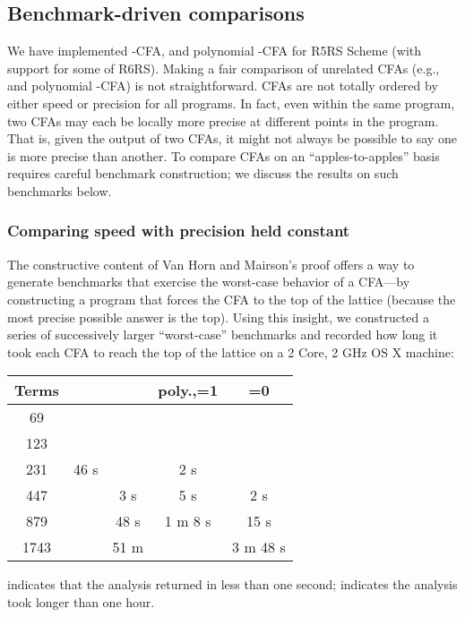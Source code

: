 \subsection{Benchmark-driven comparisons}

We have implemented -CFA, \nCFA{} and polynomial -CFA for R5RS
Scheme (with support for some of R6RS).
Making a fair comparison of unrelated CFAs (e.g., \nCFA{} and
polynomial -CFA) is not straightforward.
CFAs are not totally ordered by either speed or precision for all
programs.
In fact, even within the same program, two CFAs may each be locally
more precise at different points in the program.
That is, given the output of two CFAs, it might not always be possible
to say one is more precise than another.
To compare CFAs on an ``apples-to-apples'' basis requires careful
benchmark construction; we discuss the results on such benchmarks
below.



\subsubsection{Comparing speed with precision held constant}
The constructive content of Van Horn and Mairson's proof offers a way
to generate benchmarks that exercise the worst-case behavior of a
CFA---by constructing a program that forces the CFA to the top of the
lattice (because the most precise possible answer is the top).
Using this insight, we constructed a series of successively larger
``worst-case'' benchmarks and recorded how long it took each CFA to
reach the top of the lattice on a 2 Core, 2 GHz OS X machine:
\begin{center}
{
\begin{tabular}{|c|c|c|c|c|}
\hline
\textsf{Terms} & \textsf{} & \textsf{} & \textsf{poly.,=1} & \textsf{=0}
\\
\hline
\hline
69 &  &   &  &  
\\
\hline
123 &  &  &  & 
\\
\hline
231 & 46 s &  & 2 s & 
\\
\hline
447 &  & 3 s & 5 s & 2 s
\\
\hline
879 &  & 48 s & 1 m 8 s & 15 s
\\
\hline
1743 &  & 51 m &  &  3 m 48 s
\\
\hline
\end{tabular}
}
\end{center}
 indicates that the analysis returned in less than one
second;  indicates the analysis took longer than one hour.

